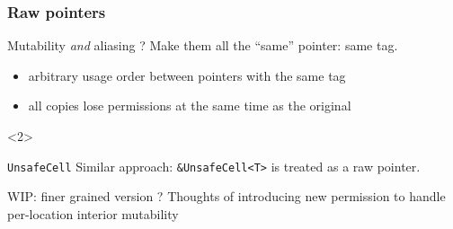 \begin{frame}[t]
    \frametitle{Raw pointers}
    \begin{block}{Mutability \textit{and} aliasing ?}
        Make them all the ``same'' pointer: same tag.
        \begin{itemize}
            \item arbitrary usage order between pointers with the same tag
            \item all copies lose permissions at the same time as the original
        \end{itemize}
    \end{block}

    \begin{onlyenv}<2>
        \begin{block}{\texttt{UnsafeCell}}
            Similar approach: \texttt{\&UnsafeCell<T>} is treated as a raw pointer.
        \end{block}

        \begin{exampleblock}{WIP: finer grained version ?}
            Thoughts of introducing new permission to handle per-location interior mutability
        \end{exampleblock}
    \end{onlyenv}
\end{frame}


